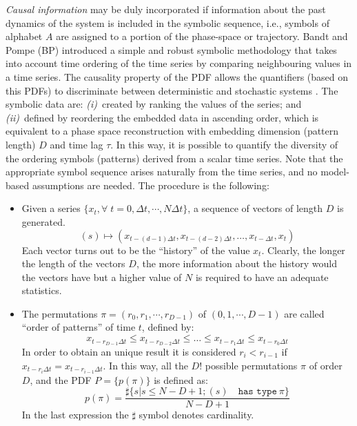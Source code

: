 {\it Causal information\/} may be duly incorporated if information about the past dynamics of the system is included in the symbolic sequence, i.e., symbols of alphabet $A$ are assigned to a portion of the phase-space or trajectory.
Bandt and Pompe (BP)\cite{Bandt2002} introduced a simple and robust symbolic methodology that takes into account time ordering of the time series by comparing neighbouring values in a time series.
The causality property of the PDF allows the quantifiers (based on this PDFs) to discriminate between deterministic and stochastic systems \cite{Rosso2007B}.
The symbolic data are:
{\it (i)\/}~created by ranking the values of the series; and
{\it (ii)\/}~defined by reordering the embedded data in ascending order, which is equivalent to a phase space reconstruction with embedding dimension (pattern length) $D$ and time lag $\tau$.
In this way, it is possible to quantify the diversity of the ordering symbols (patterns) derived from a scalar time series.
Note that the appropriate symbol sequence arises naturally from the time series, and no model-based assumptions 
are needed.
The procedure is the following:
\begin{itemize}
	\item Given a series $\{x_t, \forall \; t=0, \Delta t, \cdots,N\Delta t \}$, a sequence of vectors of length $D$ is generated.
		\begin{equation}
		(s)\longmapsto\left(x_{t-(d-1)\Delta t},x_{t-(d-2)\Delta t},\dots,x_{t-\Delta t},x_{t}\right) 
		\label{eq:vectores}
		\end{equation}
		Each vector turns out to be the ``history'' of the value $x_t$. Clearly, the longer the length of the vectors $D$, the more information about the history would the vectors have but a higher value of $N$ is required to have an adequate statistics. 
	\item The permutations $\pi=(r_0, r_1, \cdots, r_{D-1})$ of $(0, 1, \cdots, D-1)$ are called ``order of patterns'' of time $t$, defined by:
		\begin{equation}
		\label{eq:permuta}
		x_{t-r_{D-1}\Delta t}\le x_{t-r_{D-2}\Delta t}\le\dots\le x_{t-r_{1}\Delta t}\le x_{t-r_0\Delta t}
		\end{equation}
		In order to obtain an unique result it is considered $r_i<r_{i-1}$ if $x_{t-r_{i}\Delta t}=x_{t-r_{i-1}\Delta t}$.
		In this way, all the $D!$ possible permutations $\pi$ of order $D$, and the PDF $P=\{p(\pi)\}$ is defined as:
		\begin{equation}
		\label{eq:frequ}
		p(\pi)=\frac{\sharp \{s|s\leq N-D+1; (s) \quad \texttt{has type}~\pi\}}{N-D+1}
		\end{equation}
		In the last expression the $\sharp$ symbol denotes cardinality.
\end{itemize}
